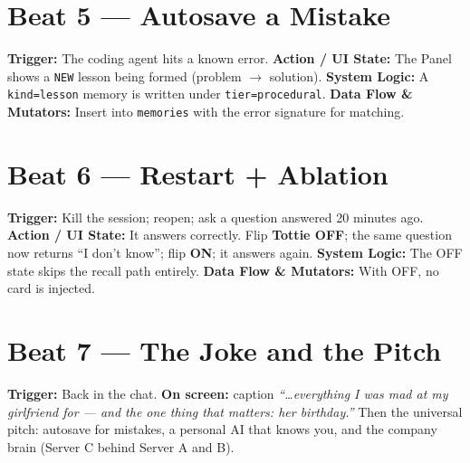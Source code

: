 \section{Beat 5 --- Autosave a Mistake}
\textbf{Trigger:} The coding agent hits a known error.
\textbf{Action / UI State:} The Panel shows a \texttt{NEW} lesson being formed
(problem $\rightarrow$ solution).
\textbf{System Logic:} A \texttt{kind=lesson} memory is written under \texttt{tier=procedural}.
\textbf{Data Flow \& Mutators:} Insert into \texttt{memories} with the error signature for matching.

\section{Beat 6 --- Restart + Ablation}
\textbf{Trigger:} Kill the session; reopen; ask a question answered 20 minutes ago.
\textbf{Action / UI State:} It answers correctly. Flip \textbf{Tottie OFF}; the same question now
returns ``I don't know''; flip \textbf{ON}; it answers again.
\textbf{System Logic:} The OFF state skips the recall path entirely.
\textbf{Data Flow \& Mutators:} With OFF, no card is injected.

\section{Beat 7 --- The Joke and the Pitch}
\textbf{Trigger:} Back in the chat.
\textbf{On screen:} caption \emph{``\ldots everything I was mad at my girlfriend for --- and the one
thing that matters: her birthday.''} Then the universal pitch: autosave for mistakes, a personal AI
that knows you, and the company brain (Server C behind Server A and B).
